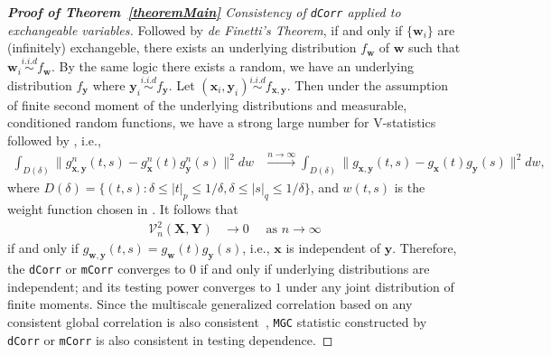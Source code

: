 \documentclass[11pt]{article}
\theoremstyle{definition}
\begin{document}
\begin{proof}[\textbf{Proof of Theorem~\ref{theoremMain}} Consistency of \texttt{dCorr} applied to exchangeable variables]
Followed by \textit{de Finetti's Theorem}, if and only if $\{ \mathbf{w}_{i} \}$ are (infinitely) exchangeble, there exists an underlying distribution $f_{\mathbf{w}}$ of $\mathbf{w}$ such that $\mathbf{w}_{i}  \overset{i.i.d}{\sim} f_{\mathbf{w}} $. By the same logic there exists a random, we have an underlying distribution $f_{\mathbf{y}}$ where $\mathbf{y}_{i} \overset{i.i.d}{\sim} f_{\mathbf{y}}$. Let $(\mathbf{x}_{i}, \mathbf{y}_{i}) \overset{i.i.d}{\sim}   f_{\mathbf{x}, \mathbf{y}}$. Then under the assumption of finite second moment of the underlying distributions and measurable, conditioned random functions, we have a strong large number for V-statistics followed by \cite{szekely2007measuring}, i.e., 
\begin{eqnarray}
\displaystyle\int_{D(\delta)}{\|g_{\mathbf{x},\mathbf{y}}^{n}(t,s)-g_{\mathbf{x}}^{n}(t)g_{\mathbf{y}}^{n}(s)\|^{2}}dw &\stackrel{n \rightarrow \infty}{\longrightarrow} 
\displaystyle\int_{D(\delta)}{\|g_{\mathbf{x},\mathbf{y}}(t,s)-g_{\mathbf{x}}(t)g_{\mathbf{y}}(s)\|^{2}}dw,
\label{eq:SLLN}
\end{eqnarray}
where $D(\delta)=\{(t,s):\delta \leq |t|_{p} \leq 1/\delta,\delta \leq |s|_{q} \leq 1/\delta\}$, and $w(t,s)$ is the weight function chosen in \cite{szekely2007measuring}. 	
It follows that 
\begin{eqnarray}
\mathcal{V}_{n}^{2}(\mathbf{X},\mathbf{Y}) &\rightarrow 0 \quad \mbox{ as } n \rightarrow \infty
\label{eq:conv2}
\end{eqnarray}
if and only if $g_{\mathbf{w},\mathbf{y}}(t,s) = g_{\mathbf{w}}(t) g_{\mathbf{y}}(s)$, i.e., $\mathbf{x}$ is independent of $\mathbf{y}$. Therefore, the \texttt{dCorr} or \texttt{mCorr} converges to $0$ if and only if  underlying distributions are independent; and its testing power converges to $1$ under any joint distribution of finite moments. Since the multiscale generalized correlation based on any consistent global correlation is also consistent~\citep{shen2016discovering}, \texttt{MGC} statistic constructed by \texttt{dCorr} or \texttt{mCorr} is also consistent in testing dependence.
\end{proof}
\end{document}
